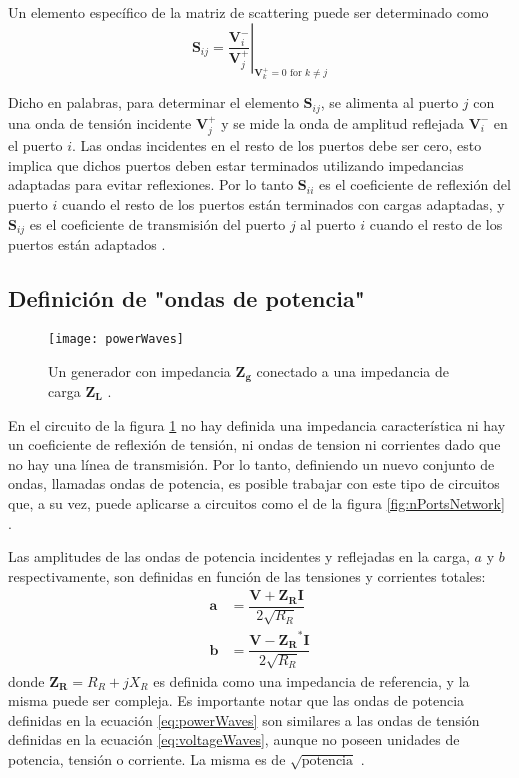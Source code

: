 Un elemento específico de la matriz de scattering puede ser determinado como
\begin{equation} \label{eq:sij}
  \bm{S}_{ij} = \left.\dfrac{\bm{V}_i^-}{\bm{V}_j^+}\right\vert_{\bm{V}_k^+ = 0\text{ for }k \neq j}
\end{equation}

Dicho en palabras, para determinar el elemento $\bm{S}_{ij}$, se alimenta al puerto $j$ con una onda de tensión incidente $\bm{V}_j^+$ y se mide la onda de amplitud reflejada $\bm{V}_i^-$ en el puerto $i$. Las ondas incidentes en el resto de los puertos debe ser cero, esto implica que dichos puertos deben estar terminados utilizando impedancias adaptadas para evitar reflexiones. Por lo tanto $\bm{S}_{ii}$ es el coeficiente de reflexión del puerto $i$ cuando el resto de los puertos están terminados con cargas adaptadas, y $\bm{S}_{ij}$ es el coeficiente de transmisión del puerto $j$ al puerto $i$ cuando el resto de los puertos están adaptados \cite{Pozar2012}.


\subsection{Definición de "ondas de potencia"}

\begin{figure}
 \centering
 \texttt{[image: powerWaves]}
 \caption{Un generador con impedancia $\bm{Z_g}$ conectado a una impedancia de carga $\bm{Z_L}$ \cite{Pozar2012}.}
 \label{fig:esquema_serie}
\end{figure}

En el circuito de la figura \ref{fig:esquema_serie} no hay definida una impedancia característica ni hay un coeficiente de reflexión de tensión, ni ondas de tension ni corrientes dado que no hay una línea de transmisión. Por lo tanto, definiendo un nuevo conjunto de ondas, llamadas ondas de potencia, es posible trabajar con este tipo de circuitos que, a su vez, puede aplicarse a circuitos como el de la figura \ref{fig:nPortsNetwork} \cite{Pozar2012}.

Las amplitudes de las ondas de potencia incidentes y reflejadas en la carga, $a$ y $b$ respectivamente, son definidas en función de las tensiones y corrientes totales:
\begin{equation}\label{eq:powerWaves}
\begin{aligned}
  \bm{a} &= \dfrac{\bm{V} + \bm{Z_RI}}{2\sqrt{R_R}} \\
  \bm{b} &= \dfrac{\bm{V} - \bm{Z_R}^*\bm{I}}{2\sqrt{R_R}}
\end{aligned}
\end{equation}
donde $\bm{Z_R} = R_R + jX_R$ es definida como una impedancia de referencia, y la misma puede ser compleja. Es importante notar que las ondas de potencia definidas en la ecuación \ref{eq:powerWaves} son similares a las ondas de tensión definidas en la ecuación \ref{eq:voltageWaves}, aunque no poseen unidades de potencia, tensión o corriente. La misma es de $\sqrt{\textrm{potencia}}$ \cite{Caspers}.

